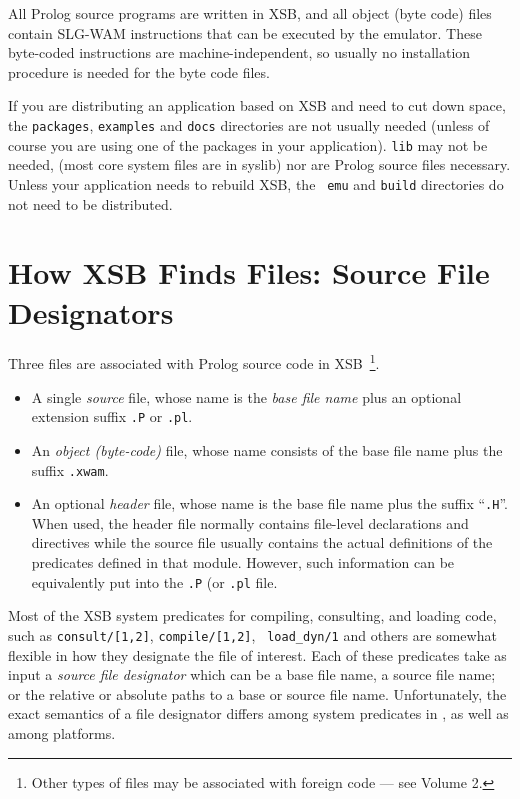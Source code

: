 \noindent
All Prolog source programs are written in XSB, and all object (byte
code) files contain SLG-WAM instructions that can be executed by the
emulator.  These byte-coded instructions are machine-independent, so
usually no installation procedure is needed for the byte code files.

If you are distributing an application based on XSB and need to cut
down space, the {\tt packages}, {\tt examples} and {\tt docs}
directories are not usually needed (unless of course you are using one
of the packages in your application).  {\tt lib} may not be needed,
(most core system files are in syslib) nor are Prolog source files
necessary.  Unless your application needs to rebuild XSB, the {\tt
  emu} and {\tt build} directories do not need to be distributed.

\section{How XSB Finds Files: Source File Designators}  \label{sec:filenames}
%
Three files are associated with Prolog source code in
XSB~\footnote{Other types of files may be associated with foreign code
--- see Volume 2.}.
\begin{itemize}
\item A single {\it source} file, whose name is the {\em base file
  name} plus an optional extension suffix {\tt .P} or {\tt .pl}.
\item An {\it object (byte-code)} file, whose name consists of the
  base file name plus the suffix {\tt .xwam}.
\item An optional {\it header} file, whose name is the base file name
  plus the suffix ``{\tt .H}''.  When used, the header file normally
  contains file-level declarations and directives while the source
  file usually contains the actual definitions of the predicates
  defined in that module.  However, such information can be
  equivalently put into the {\tt .P} (or {\tt .pl} file.
\end{itemize}
%
Most of the XSB system predicates for compiling, consulting, and
loading code, such as {\tt consult/[1,2]}, {\tt compile/[1,2]}, {\tt
  load\_dyn/1} and others are somewhat flexible in how they designate
the file of interest.  Each of these predicates take as input a {\em
  source file designator} which can be a base file name, a source file
name; or the relative or absolute paths to a base or source file name.
Unfortunately, the exact semantics of a file designator differs among
system predicates in \version, as well as among platforms.

